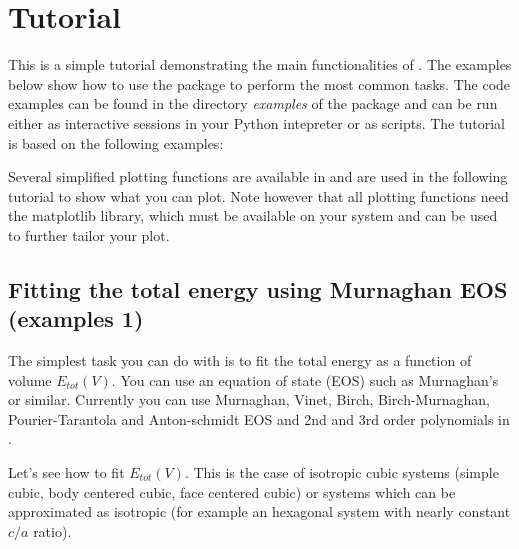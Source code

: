\documentclass[letterpaper,10pt,english]{sphinxmanual}
\begin{document}
\chapter{Tutorial}
\label{tutorial:tutorial}\label{tutorial::doc}\label{tutorial:id1}
This is a simple tutorial demonstrating the main functionalities of . The examples below show how to use the package to perform the most common tasks. The code examples can be found in the directory \emph{examples} of the package and can be run either as interactive sessions in your Python intepreter or as scripts.
The tutorial is based on the following examples:

Several simplified plotting functions are available in  and are used in the following tutorial to show what you can plot.
Note however that all plotting functions need the matplotlib library, which must be available on your system and can be used to further tailor your plot.


\section{Fitting the total energy using Murnaghan EOS (examples 1)}
\label{tutorial:fitting-the-total-energy-using-murnaghan-eos-examples-1}
The simplest task you can do with  is to fit the total energy as a function of volume \(E_{tot}(V)\). You can use
an equation of state (EOS) such as Murnaghan's or similar.  Currently you can use Murnaghan, Vinet, Birch, Birch-Murnaghan, Pourier-Tarantola and Anton-schmidt EOS and 2nd and 3rd order polynomials in .

Let's see how to fit \(E_{tot}(V)\). This is the case of isotropic cubic systems (simple cubic, body centered cubic, face centered cubic) or systems which can be approximated as isotropic (for example an hexagonal system with nearly constant \(c/a\) ratio).
\end{document}
